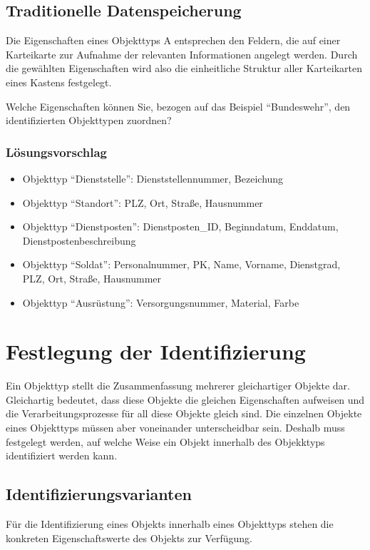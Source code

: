       \subsection{Traditionelle Datenspeicherung}
        Die Eigenschaften eines Objekttyps A entsprechen den Feldern, die auf
        einer Karteikarte zur Aufnahme der relevanten Informationen angelegt
        werden. Durch die gew\"ahlten Eigenschaften wird also die einheitliche
        Struktur aller Karteikarten eines Kastens festgelegt.

        Welche Eigenschaften k\"onnen Sie, bezogen auf das Beispiel
        \enquote{Bundeswehr}, den identifizierten Objekttypen zuordnen?
        \subsubsection{L\"osungsvorschlag}
          \begin{itemize}
            \item Objekttyp \enquote{Dienststelle}: Dienststellennummer,
            Bezeichung
            \item Objekttyp \enquote{Standort}: PLZ, Ort, Stra\ss e, Hausnummer
            \item Objekttyp \enquote{Dienstposten}: Dienstposten\_ID,
            Beginndatum, Enddatum, Dienstpostenbeschreibung
            \item Objekttyp \enquote{Soldat}: Personalnummer, PK, Name, Vorname,
            Dienstgrad, PLZ, Ort, Stra\ss e, Hausnummer
            \item Objekttyp \enquote{Ausr\"ustung}: Versorgungsnummer, Material,
            Farbe
          \end{itemize}
    \section{Festlegung der Identifizierung}
      Ein Objekttyp stellt die Zusammenfassung mehrerer gleichartiger Objekte
      dar. Gleichartig bedeutet, dass diese Objekte die gleichen Eigenschaften
      aufweisen und die Verarbeitungsprozesse f\"ur all diese Objekte gleich
      sind. Die einzelnen Objekte eines Objekttyps m\"ussen aber voneinander
      unterscheidbar sein. Deshalb muss festgelegt werden, auf welche Weise ein
      Objekt innerhalb des Objekktyps identifiziert werden kann.

      \subsection{Identifizierungsvarianten}
        F\"ur die Identifizierung eines Objekts innerhalb eines Objekttyps
        stehen die konkreten Eigenschaftswerte des Objekts zur Verf\"ugung.

